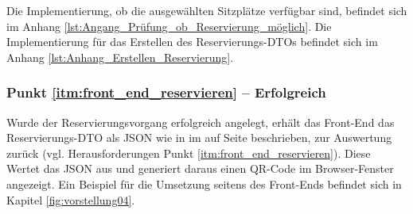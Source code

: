 Die Implementierung, ob die ausgewählten Sitzplätze verfügbar sind, befindet sich im Anhang \vref{lst:Angang_Prüfung_ob_Reservierung_möglich}. Die Implementierung für das Erstellen des Reservierungs-\acp{DTO} befindet sich im Anhang \vref{lst:Anhang_Erstellen_Reservierung}.  

\subsubsection*{Punkt \ref{itm:front_end_reservieren} -- Erfolgreich}
\label{ssssec:front_end_reservieren}
Wurde der Reservierungsvorgang erfolgreich angelegt, erhält das Front-End das Reservierungs-\acs{DTO} als \acs{JSON} wie in  im  auf Seite \pageref{ssssec:erfolgreich_blocken} beschrieben, zur Auswertung zurück (vgl. Herausforderungen Punkt \vref{itm:front_end_reservieren}). Diese Wertet das \acs{JSON} aus und generiert daraus einen QR-Code im Browser-Fenster angezeigt. 
Ein Beispiel für die Umsetzung seitens des Front-Ends befindet sich in Kapitel \vref{fig:vorstellung04}.
